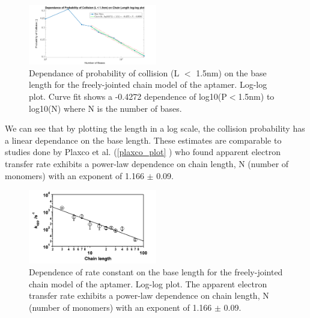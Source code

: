 \begin{figure}[H]
    \centering
    \includegraphics[width = 0.5\textwidth]{img/Length_dep_bases_log.png}
    \caption{Dependance of probability of collision (L $<$ 1.5nm) on the base length for the freely-jointed chain model of the aptamer. Log-log plot. Curve fit shows a -0.4272 dependence of log10(P$<$1.5nm) to log10(N) where N is the number of bases.}
    \label{dep_plot_2}
\end{figure}
We can see that by plotting the length in a log scale, the collision probability has a linear dependance on the base length. These estimates are comparable to studies done by Plaxco et al. (\autoref{plaxco_plot} \cite{arroyo2018subsecond}) who found apparent electron transfer rate exhibits a power-law dependence on chain length, N (number of monomers)
with an exponent of 1.166 $\pm$ 0.09.
\begin{figure}[H]
    \centering
    \includegraphics[width = 0.5\textwidth]{img/Plaxco_k_app_vs_length.png}
    \caption{Dependence of rate constant on the base length for the freely-jointed chain model of the aptamer. Log-log plot. The apparent electron transfer rate exhibits a power-law dependence on chain length, N (number of monomers) with an exponent of 1.166 $\pm$ 0.09. \cite{uzawa2010mechanistic}}
    \label{plaxco_plot}
\end{figure}
